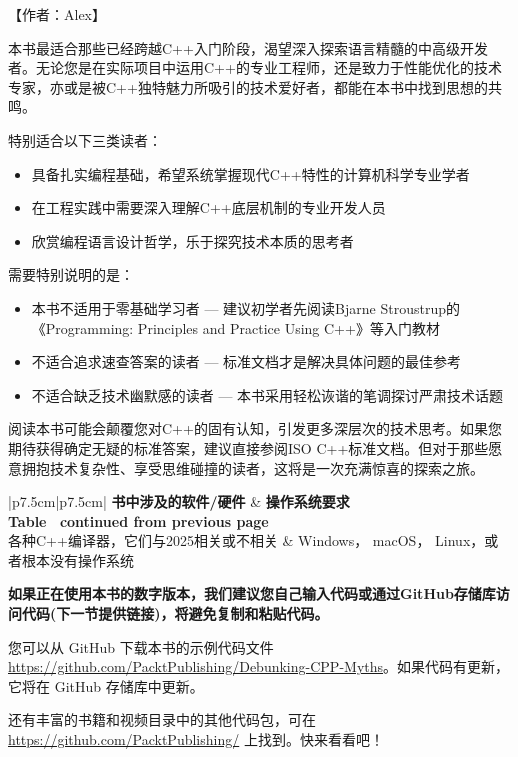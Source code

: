 【作者：Alex】


本书最适合那些已经跨越C++入门阶段，渴望深入探索语言精髓的中高级开发者。无论您是在实际项目中运用C++的专业工程师，还是致力于性能优化的技术专家，亦或是被C++独特魅力所吸引的技术爱好者，都能在本书中找到思想的共鸣。

特别适合以下三类读者：

\begin{itemize}
\item 
具备扎实编程基础，希望系统掌握现代C++特性的计算机科学专业学者

\item 
在工程实践中需要深入理解C++底层机制的专业开发人员

\item 
欣赏编程语言设计哲学，乐于探究技术本质的思考者
\end{itemize}

需要特别说明的是：

\begin{itemize}
\item 
本书不适用于零基础学习者 --- 建议初学者先阅读Bjarne Stroustrup的《Programming: Principles and Practice Using C++》等入门教材

\item 
不适合追求速查答案的读者 --- 标准文档才是解决具体问题的最佳参考

\item 
不适合缺乏技术幽默感的读者 --- 本书采用轻松诙谐的笔调探讨严肃技术话题
\end{itemize}

阅读本书可能会颠覆您对C++的固有认知，引发更多深层次的技术思考。如果您期待获得确定无疑的标准答案，建议直接参阅ISO C++标准文档。但对于那些愿意拥抱技术复杂性、享受思维碰撞的读者，这将是一次充满惊喜的探索之旅。

\begin{longtable}{|p{7.5cm}|p{7.5cm}|}
\hline
\textbf{书中涉及的软件/硬件}          & \textbf{操作系统要求}               \\ \hline
\endfirsthead
%
%
{{\bfseries Table \thetable\ continued from previous page}} \\
\endhead
%
各种C++编译器，它们与2025相关或不相关 & Windows， macOS， Linux，或者根本没有操作系统 \\ \hline
\end{longtable}

\textbf{如果正在使用本书的数字版本，我们建议您自己输入代码或通过GitHub存储库访问代码(下一节提供链接)，将避免复制和粘贴代码。}


您可以从 GitHub 下载本书的示例代码文件 \url{https://github.com/PacktPublishing/Debunking-CPP-Myths}。如果代码有更新，它将在 GitHub 存储库中更新。

还有丰富的书籍和视频目录中的其他代码包，可在 \url{https://github.com/PacktPublishing/} 上找到。快来看看吧！







